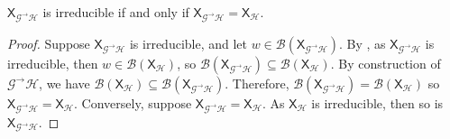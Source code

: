 \documentclass[hidelinks]{article}
\newcommand{\Lc}{\mathcal{L}}  %
\newcommand{\Gc}{\mathcal{G}}  %
\newcommand{\Hc}{\mathcal{H}}  %
\newcommand{\Bc}{\mathcal{B}}
\newcommand{\GtH}{{\Gc^\to\Hc}}
\newcommand{\shift}[1]{\mathsf{X}_{#1}}
\theoremstyle{definition}
\begin{document}


\begin{theorem}\label{irreq}
    \(\shift{\GtH}\) is irreducible if and only if \(\shift{\GtH} = \shift{\Hc}\).
\end{theorem}

\begin{proof}
    Suppose \(\shift{\GtH}\) is irreducible, and let \(w \in \Bc(\shift{\GtH})\). By , 
    as \(\shift{\GtH}\) is irreducible, then \(w \in \Bc(\shift{\Hc})\), so \(\Bc(\shift{\GtH}) \subseteq \Bc(\shift{\Hc})\).
    By construction of \(\GtH\), we have \(\Bc(\shift{\Hc}) \subseteq \Bc(\shift{\GtH})\). Therefore, 
    \(\Bc(\shift{\GtH}) = \Bc(\shift{\Hc})\) so \(\shift{\GtH} = \shift{\Hc}\).
    Conversely, suppose \(\shift{\GtH} = \shift{\Hc}\). As \(\shift{\Hc}\) is irreducible, then so 
    is \(\shift{\GtH}\).
\end{proof}
\end{document}
